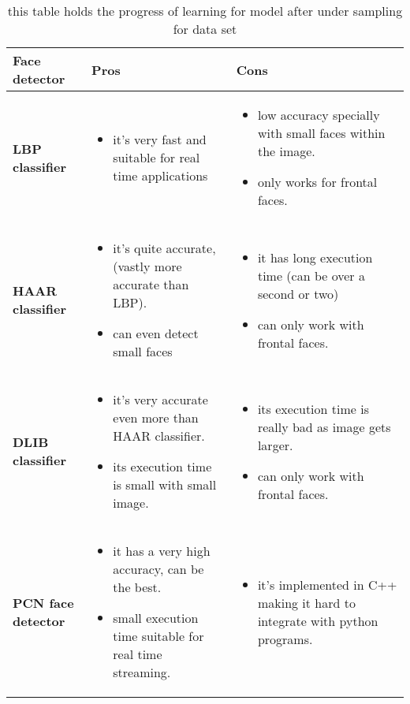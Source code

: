 \begin{table}[h!]
	\centering
	\begin{tabular}{m{3cm} | m{5cm} | m{5cm}}
		\textbf{Face detector} & \textbf{Pros} & \textbf{Cons}\\ \hline 
		\textbf{LBP classifier} 
		&
		\begin{itemize}
			\item it's very fast and suitable for real time applications 
		\end{itemize}

		& 
		\begin{itemize}
			\item low accuracy specially with small faces within the image.
			\item only works for frontal faces.
		\end{itemize}
		\\ \hline
		
		\textbf{HAAR classifier} 
		& 
		\begin{itemize}
			\item it's quite accurate, (vastly more accurate than LBP).
			\item can even detect small faces
		\end{itemize}
		& 
		\begin{itemize}
			\item it has long execution time (can be over a second or two)
			\item can only work with frontal faces.
		\end{itemize} 
		\\ \hline
		
		\textbf{DLIB classifier}
		& 
		\begin{itemize}
			\item it's very accurate even more than HAAR classifier.
			\item its execution time is small with small image.
		\end{itemize}
		& 
		\begin{itemize}
			\item its execution time is really bad as image gets larger.
			\item can only work with frontal faces.
		\end{itemize}
		\\ \hline
		\textbf{PCN face detector }
		& 
		\begin{itemize}
			\item it has a very high accuracy, can be the best.
			\item small execution time suitable for real time streaming.
		\end{itemize} 
		& 
		\begin{itemize}
			\item it's implemented in C++ making it hard to integrate with python programs.
		\end{itemize}
		\\
	\end{tabular}
	\label{tab:facedetectors_compared}
	\caption{this table holds the progress of learning for model after under sampling for data set}
\end{table}